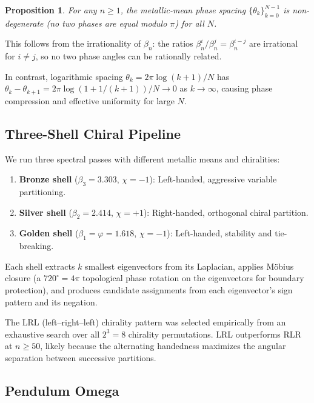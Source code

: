 \documentclass[11pt,a4paper]{article}
\newtheorem{proposition}{Proposition}
\begin{document}
\begin{proposition}
For any $n \geq 1$, the metallic-mean phase spacing
$\{\theta_k\}_{k=0}^{N-1}$ is non-degenerate (no two phases are equal
modulo $\pi$) for all $N$.
\end{proposition}

This follows from the irrationality of $\beta_n$: the ratios
$\beta_n^i / \beta_n^j = \beta_n^{i-j}$ are irrational for $i \neq j$,
so no two phase angles can be rationally related.

In contrast, logarithmic spacing $\theta_k = 2\pi\log(k+1)/N$
has $\theta_k - \theta_{k+1} = 2\pi\log(1 + 1/(k+1))/N \to 0$ as
$k \to \infty$, causing phase compression and effective uniformity
for large $N$.

\subsection{Three-Shell Chiral Pipeline}

We run three spectral passes with different metallic means and
chiralities:

\begin{enumerate}[leftmargin=*]
\item \textbf{Bronze shell} ($\beta_3 = 3.303$, $\chi = -1$):
  Left-handed, aggressive variable partitioning.
\item \textbf{Silver shell} ($\beta_2 = 2.414$, $\chi = +1$):
  Right-handed, orthogonal chiral partition.
\item \textbf{Golden shell} ($\beta_1 = \varphi = 1.618$, $\chi = -1$):
  Left-handed, stability and tie-breaking.
\end{enumerate}

Each shell extracts $k$ smallest eigenvectors from its Laplacian,
applies M\"obius closure (a $720^\circ = 4\pi$ topological phase
rotation on the eigenvectors for boundary protection), and produces
candidate assignments from each eigenvector's sign pattern and its
negation.

The LRL (left--right--left) chirality pattern was selected empirically
from an exhaustive search over all $2^3 = 8$ chirality permutations.
LRL outperforms RLR at $n \geq 50$, likely because the alternating
handedness maximizes the angular separation between successive
partitions.

\subsection{Pendulum Omega}
\end{document}
